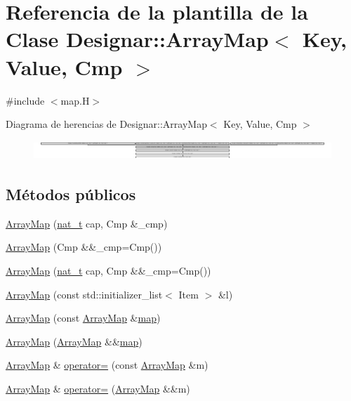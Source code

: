 \hypertarget{class_designar_1_1_array_map}{}\section{Referencia de la plantilla de la Clase Designar\+:\+:Array\+Map$<$ Key, Value, Cmp $>$}
\label{class_designar_1_1_array_map}


{\ttfamily \#include $<$map.\+H$>$}

Diagrama de herencias de Designar\+:\+:Array\+Map$<$ Key, Value, Cmp $>$\begin{figure}[H]
\begin{center}
\leavevmode
\includegraphics[height=0.724638cm]{class_designar_1_1_array_map}
\end{center}
\end{figure}
\subsection*{Métodos públicos}
\begin{DoxyCompactItemize}
\item 
\hyperlink{class_designar_1_1_array_map_aa08404c6d0b6d40d7aefd04ccea24bc5}{Array\+Map} (\hyperlink{namespace_designar_aa72662848b9f4815e7bf31a7cf3e33d1}{nat\+\_\+t} cap, Cmp \&\+\_\+cmp)
\item 
\hyperlink{class_designar_1_1_array_map_ac7113b782b6ade75f5ccc843ecc2c153}{Array\+Map} (Cmp \&\&\+\_\+cmp=Cmp())
\item 
\hyperlink{class_designar_1_1_array_map_a553f96874d7e4037c333edd6dd76ba31}{Array\+Map} (\hyperlink{namespace_designar_aa72662848b9f4815e7bf31a7cf3e33d1}{nat\+\_\+t} cap, Cmp \&\&\+\_\+cmp=Cmp())
\item 
\hyperlink{class_designar_1_1_array_map_aea553306fead24dc02e06ea89146d4f0}{Array\+Map} (const std\+::initializer\+\_\+list$<$ Item $>$ \&l)
\item 
\hyperlink{class_designar_1_1_array_map_a47288ae6af2300316c32e55bf46f7713}{Array\+Map} (const \hyperlink{class_designar_1_1_array_map}{Array\+Map} \&\hyperlink{class_designar_1_1_container_algorithms_a3b9044a197e4ceec6a1de03de197a293}{map})
\item 
\hyperlink{class_designar_1_1_array_map_a86b665176315dedc19b78479a47aa810}{Array\+Map} (\hyperlink{class_designar_1_1_array_map}{Array\+Map} \&\&\hyperlink{class_designar_1_1_container_algorithms_a3b9044a197e4ceec6a1de03de197a293}{map})
\item 
\hyperlink{class_designar_1_1_array_map}{Array\+Map} \& \hyperlink{class_designar_1_1_array_map_acc6b11ade9bcae167fb939cc6eec6c6e}{operator=} (const \hyperlink{class_designar_1_1_array_map}{Array\+Map} \&m)
\item 
\hyperlink{class_designar_1_1_array_map}{Array\+Map} \& \hyperlink{class_designar_1_1_array_map_a2bc354ad6ea6eb8103a8bca14abdece2}{operator=} (\hyperlink{class_designar_1_1_array_map}{Array\+Map} \&\&m)
\end{DoxyCompactItemize}

